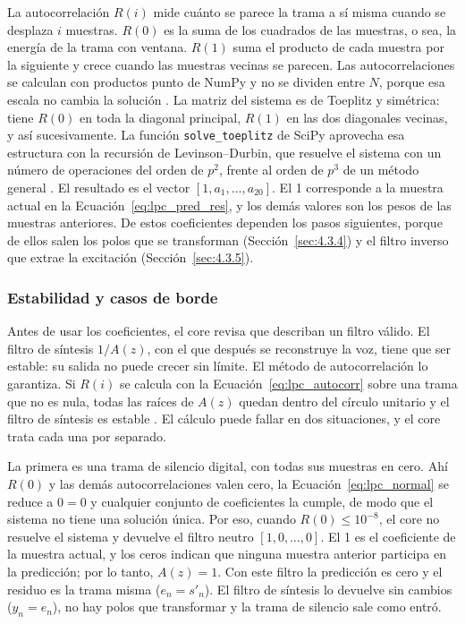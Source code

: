 \documentclass[10pt,twocolumn]{article}
\newcommand{\parencite}[1]{\citep{#1}}
\begin{document}
\noindent La autocorrelación $R(i)$ mide cuánto se parece la trama a sí misma cuando se desplaza $i$ muestras. $R(0)$ es la suma de los cuadrados de las muestras, o sea, la energía de la trama con ventana. $R(1)$ suma el producto de cada muestra por la siguiente y crece cuando las muestras vecinas se parecen. Las autocorrelaciones se calculan con productos punto de NumPy y no se dividen entre $N$, porque esa escala no cambia la solución \parencite{makhoul1975}. La matriz del sistema es de Toeplitz y simétrica: tiene $R(0)$ en toda la diagonal principal, $R(1)$ en las dos diagonales vecinas, y así sucesivamente. La función \texttt{solve\_toeplitz} de SciPy aprovecha esa estructura con la recursión de Levinson--Durbin, que resuelve el sistema con un número de operaciones del orden de $p^2$, frente al orden de $p^3$ de un método general \parencite{makhoul1975}. El resultado es el vector $[1,a_1,\ldots,a_{20}]$. El 1 corresponde a la muestra actual en la Ecuación~\ref{eq:lpc_pred_res}, y los demás valores son los pesos de las muestras anteriores. De estos coeficientes dependen los pasos siguientes, porque de ellos salen los polos que se transforman (Sección~\ref{sec:4.3.4}) y el filtro inverso que extrae la excitación (Sección~\ref{sec:4.3.5}).

\subsubsection{Estabilidad y casos de borde}\label{sec:4.3.3}

Antes de usar los coeficientes, el core revisa que describan un filtro válido. El filtro de síntesis $1/A(z)$, con el que después se reconstruye la voz, tiene que ser estable: su salida no puede crecer sin límite. El método de autocorrelación lo garantiza. Si $R(i)$ se calcula con la Ecuación~\ref{eq:lpc_autocorr} sobre una trama que no es nula, todas las raíces de $A(z)$ quedan dentro del círculo unitario y el filtro de síntesis es estable \parencite{makhoul1975}. El cálculo puede fallar en dos situaciones, y el core trata cada una por separado.

La primera es una trama de silencio digital, con todas sus muestras en cero. Ahí $R(0)$ y las demás autocorrelaciones valen cero, la Ecuación~\ref{eq:lpc_normal} se reduce a $0=0$ y cualquier conjunto de coeficientes la cumple, de modo que el sistema no tiene una solución única. Por eso, cuando $R(0)\le10^{-8}$, el core no resuelve el sistema y devuelve el filtro neutro $[1,0,\ldots,0]$. El 1 es el coeficiente de la muestra actual, y los ceros indican que ninguna muestra anterior participa en la predicción; por lo tanto, $A(z)=1$. Con este filtro la predicción es cero y el residuo es la trama misma ($e_n=s'_n$). El filtro de síntesis lo devuelve sin cambios ($y_n=e_n$), no hay polos que transformar y la trama de silencio sale como entró.
\end{document}
